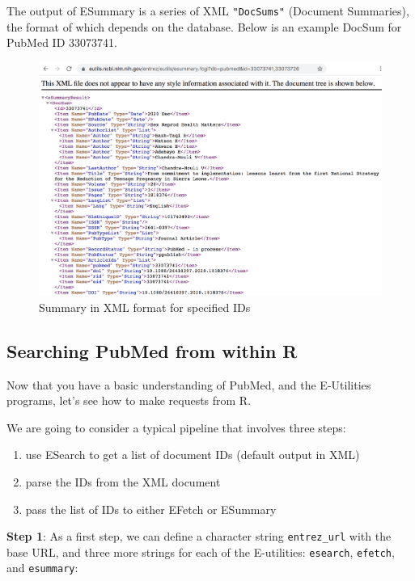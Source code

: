\documentclass[
]{book}
\begin{document}
The output of ESummary is a series of XML \texttt{"DocSums"} (Document Summaries), the
format of which depends on the database. Below is an example DocSum for PubMed
ID 33073741.

\begin{figure}

{\centering \includegraphics[width=0.8\linewidth]{images/api/pubmed-esummary} 

}

\caption{Summary in XML format for specified IDs}\label{fig:unnamed-chunk-136}
\end{figure}

\hypertarget{searching-pubmed-from-within-r}{%
\subsection{Searching PubMed from within R}\label{searching-pubmed-from-within-r}}

Now that you have a basic understanding of PubMed, and the E-Utilities
programs, let's see how to make requests from R.

We are going to consider a typical pipeline that involves three steps:

\begin{enumerate}
\def\labelenumi{\arabic{enumi})}
\item
  use ESearch to get a list of document IDs (default output in XML)
\item
  parse the IDs from the XML document
\item
  pass the list of IDs to either EFetch or ESummary
\end{enumerate}

\textbf{Step 1}: As a first step, we can define a character string \texttt{entrez\_url} with
the base URL, and three more strings for each of the E-utilities: \texttt{esearch},
\texttt{efetch}, and \texttt{esummary}:
\end{document}

